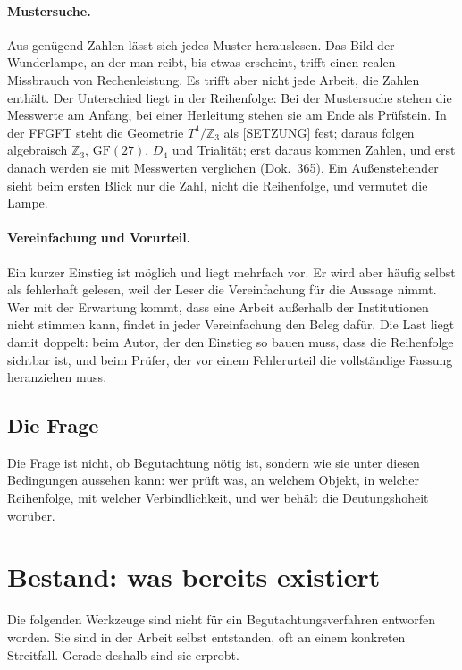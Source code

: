 \paragraph{Mustersuche.} Aus genügend Zahlen lässt sich jedes Muster herauslesen. Das
Bild der Wunderlampe, an der man reibt, bis etwas erscheint, trifft einen realen
Missbrauch von Rechenleistung. Es trifft aber nicht jede Arbeit, die Zahlen enthält.
Der Unterschied liegt in der Reihenfolge: Bei der Mustersuche stehen die Messwerte am
Anfang, bei einer Herleitung stehen sie am Ende als Prüfstein. In der FFGFT steht
die Geometrie $T^4/\mathbb{Z}_3$ als {[SETZUNG]} fest; daraus folgen
algebraisch $\mathbb{Z}_3$, $\mathrm{GF}(27)$, $D_4$ und Trialität; erst daraus
kommen Zahlen, und erst danach werden sie mit Messwerten verglichen (Dok.~365).
Ein Außenstehender sieht beim ersten Blick nur die Zahl, nicht die Reihenfolge, und
vermutet die Lampe.

\paragraph{Vereinfachung und Vorurteil.} Ein kurzer Einstieg ist möglich und liegt
mehrfach vor. Er wird aber häufig selbst als fehlerhaft gelesen, weil der Leser die
Vereinfachung für die Aussage nimmt. Wer mit der Erwartung kommt, dass eine Arbeit
außerhalb der Institutionen nicht stimmen kann, findet in jeder Vereinfachung den
Beleg dafür. Die Last liegt damit doppelt: beim Autor, der den Einstieg so bauen muss,
dass die Reihenfolge sichtbar ist, und beim Prüfer, der vor einem Fehlerurteil die
vollständige Fassung heranziehen muss.

\subsection{Die Frage}

Die Frage ist nicht, ob Begutachtung nötig ist, sondern wie sie unter diesen
Bedingungen aussehen kann: wer prüft was, an welchem Objekt, in welcher Reihenfolge,
mit welcher Verbindlichkeit, und wer behält die Deutungshoheit worüber.

\section{Bestand: was bereits existiert}

Die folgenden Werkzeuge sind nicht für ein Begutachtungsverfahren entworfen worden. Sie
sind in der Arbeit selbst entstanden, oft an einem konkreten Streitfall. Gerade deshalb
sind sie erprobt.

